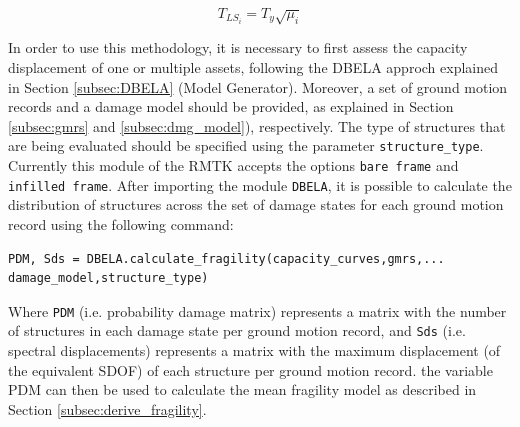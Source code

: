 \begin{equation}
T_{LS_i} = T_y\sqrt{\mu_{i}}
\end{equation}

In order to use this methodology, it is necessary to first assess the capacity displacement of one or multiple assets, following the DBELA approch explained in Section \ref{subsec:DBELA} (Model Generator). Moreover, a set of ground motion records and a damage model should be provided, as explained in Section \ref{subsec:gmrs} and \ref{subsec:dmg_model}), respectively. The type of structures that are being evaluated should be specified using the parameter \verb=structure_type=. Currently this module of the RMTK accepts the options \verb=bare frame= and \verb=infilled frame=. After importing the module \verb=DBELA=, it is possible to calculate the distribution of structures across the set of damage states for each ground motion record using the following command:

\begin{Verbatim}[frame=single, commandchars=\\\{\}, samepage=true]
PDM, Sds = DBELA.calculate_fragility(capacity_curves,gmrs,...
damage_model,structure_type)
\end{Verbatim}

Where \verb=PDM= (i.e. probability damage matrix) represents a matrix with the number of structures in each damage state per ground motion record, and \verb=Sds= (i.e. spectral displacements) represents a matrix with the maximum displacement (of the equivalent SDOF) of each structure per ground motion record. the variable PDM can then be used to calculate the mean fragility model as described in Section \ref{subsec:derive_fragility}.